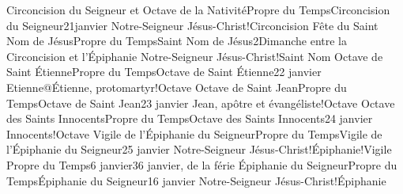 \documentclass[twoside, french]{book}
\begin{document}
        {Circoncision du Seigneur et Octave de la Nativité}{Propre du Temps}{Circoncision du Seigneur}{2}{1\ier janvier}
        {}{}{Notre-Seigneur Jésus-Christ!Circoncision}{}{}
        {Fête du Saint Nom de Jésus}{Propre du Temps}{Saint Nom de Jésus}{2}{Dimanche entre la Circoncision et l’Épiphanie}
        {}{}{Notre-Seigneur Jésus-Christ!Saint Nom}{}{}
        {Octave de Saint Étienne}{Propre du Temps}{Octave de Saint Étienne}{2}{2 janvier}
        {}{}{Etienne@Étienne, protomartyr!Octave}{}{}
        {Octave de Saint Jean}{Propre du Temps}{Octave de Saint Jean}{2}{3 janvier}
        {}{}{Jean, apôtre et évangéliste!Octave}{}{}
        {Octave des Saints Innocents}{Propre du Temps}{Octave des Saints Innocents}{2}{4 janvier}
        {}{}{Innocents!Octave}{}{}
        {Vigile de l’Épiphanie du Seigneur}{Propre du Temps}{Vigile de l’Épiphanie du Seigneur}{2}{5 janvier}
        {}{}{Notre-Seigneur Jésus-Christ!Épiphanie!Vigile}{}{}
        {}{Propre du Temps}{6 janvier}{3}{6 janvier, de la férie}
        {}{}{}{}{}
        {Épiphanie du Seigneur}{Propre du Temps}{Épiphanie du Seigneur}{1}{6 janvier}
        {}{}{Notre-Seigneur Jésus-Christ!Épiphanie}{}{}
\end{document}
